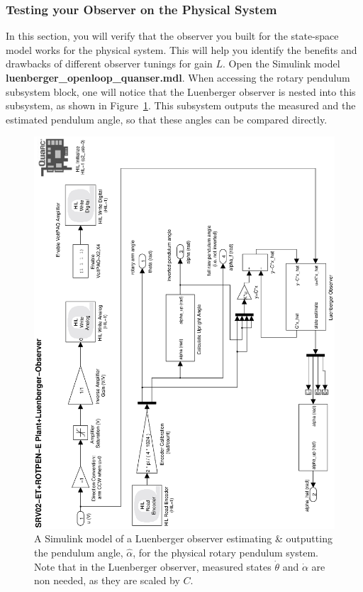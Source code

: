 \documentclass[12pt]{report}
\begin{document}
\subsubsection{Testing your Observer on the Physical System}\label{sub subsection:lab3_observer_test}
In this section, you will verify that the observer you built for the state-space model works for the physical system. This will help you identify the benefits and drawbacks of different observer tunings for gain $L$. Open the Simulink model \textbf{luenberger\_openloop\_quanser.mdl}. When accessing the rotary pendulum subsystem block, one will notice that the Luenberger observer is nested into this subsystem, as shown in Figure~\ref{figure:lab3_luenberger_openloop_quanser}. This subsystem outputs the measured and the estimated pendulum angle, so that these angles can be compared directly.
\begin{figure}[htb!]
    \centering
    \includegraphics[width=0.6\linewidth,angle=-90]{eps/lab_3/luenberger_openloop_quanser}
    \caption{A Simulink model of a Luenberger observer estimating \& outputting the pendulum angle, $\hat{\alpha}$, for the physical rotary pendulum system. Note that in the Luenberger observer, measured states $\dot{\theta}$ and $\dot{\alpha}$ are non needed, as they are scaled by $C$.}
    \label{figure:lab3_luenberger_openloop_quanser}
\end{figure}
\newpage
\end{document}

